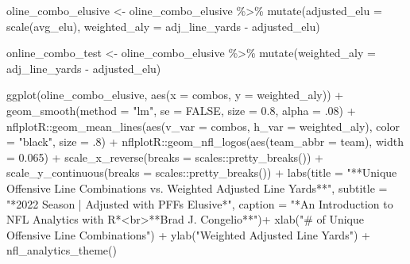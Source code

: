 \documentclass[
  letterpaper,
]{krantz}
\newenvironment{Shaded}{\begin{snugshade}}{\end{snugshade}}
\newcommand{\AttributeTok}[1]{\textcolor[rgb]{0.40,0.45,0.13}{#1}}
\newcommand{\ConstantTok}[1]{\textcolor[rgb]{0.56,0.35,0.01}{#1}}
\newcommand{\DecValTok}[1]{\textcolor[rgb]{0.68,0.00,0.00}{#1}}
\newcommand{\FloatTok}[1]{\textcolor[rgb]{0.68,0.00,0.00}{#1}}
\newcommand{\FunctionTok}[1]{\textcolor[rgb]{0.28,0.35,0.67}{#1}}
\newcommand{\NormalTok}[1]{\textcolor[rgb]{0.00,0.23,0.31}{#1}}
\newcommand{\OtherTok}[1]{\textcolor[rgb]{0.00,0.23,0.31}{#1}}
\newcommand{\SpecialCharTok}[1]{\textcolor[rgb]{0.37,0.37,0.37}{#1}}
\newcommand{\StringTok}[1]{\textcolor[rgb]{0.13,0.47,0.30}{#1}}
\begin{document}
\begin{Shaded}
\begin{Highlighting}[]
\NormalTok{oline\_combo\_elusive }\OtherTok{\textless{}{-}}\NormalTok{ oline\_combo\_elusive }\SpecialCharTok{\%\textgreater{}\%}
  \FunctionTok{mutate}\NormalTok{(}\AttributeTok{adjusted\_elu =} \FunctionTok{scale}\NormalTok{(avg\_elu),}
         \AttributeTok{weighted\_aly =}\NormalTok{ adj\_line\_yards }\SpecialCharTok{{-}}\NormalTok{ adjusted\_elu)}

\NormalTok{online\_combo\_test }\OtherTok{\textless{}{-}}\NormalTok{ oline\_combo\_elusive }\SpecialCharTok{\%\textgreater{}\%}
  \FunctionTok{mutate}\NormalTok{(}\AttributeTok{weighted\_aly =}\NormalTok{ adj\_line\_yards }\SpecialCharTok{{-}}\NormalTok{ adjusted\_elu)}

\FunctionTok{ggplot}\NormalTok{(oline\_combo\_elusive, }\FunctionTok{aes}\NormalTok{(}\AttributeTok{x =}\NormalTok{ combos, }\AttributeTok{y =}\NormalTok{ weighted\_aly)) }\SpecialCharTok{+}
  \FunctionTok{geom\_smooth}\NormalTok{(}\AttributeTok{method =} \StringTok{"lm"}\NormalTok{, }\AttributeTok{se =} \ConstantTok{FALSE}\NormalTok{, }\AttributeTok{size =} \FloatTok{0.8}\NormalTok{, }\AttributeTok{alpha =}\NormalTok{ .}\DecValTok{08}\NormalTok{) }\SpecialCharTok{+}
\NormalTok{  nflplotR}\SpecialCharTok{::}\FunctionTok{geom\_mean\_lines}\NormalTok{(}\FunctionTok{aes}\NormalTok{(}\AttributeTok{v\_var =}\NormalTok{ combos, }\AttributeTok{h\_var =}\NormalTok{ weighted\_aly),}
                            \AttributeTok{color =} \StringTok{"black"}\NormalTok{, }\AttributeTok{size =}\NormalTok{ .}\DecValTok{8}\NormalTok{) }\SpecialCharTok{+}
\NormalTok{  nflplotR}\SpecialCharTok{::}\FunctionTok{geom\_nfl\_logos}\NormalTok{(}\FunctionTok{aes}\NormalTok{(}\AttributeTok{team\_abbr =}\NormalTok{ team), }\AttributeTok{width =} \FloatTok{0.065}\NormalTok{) }\SpecialCharTok{+}
  \FunctionTok{scale\_x\_reverse}\NormalTok{(}\AttributeTok{breaks =}\NormalTok{ scales}\SpecialCharTok{::}\FunctionTok{pretty\_breaks}\NormalTok{()) }\SpecialCharTok{+}
  \FunctionTok{scale\_y\_continuous}\NormalTok{(}\AttributeTok{breaks =}\NormalTok{ scales}\SpecialCharTok{::}\FunctionTok{pretty\_breaks}\NormalTok{()) }\SpecialCharTok{+}
  \FunctionTok{labs}\NormalTok{(}\AttributeTok{title =} \StringTok{"**Unique Offensive Line Combinations vs. Weighted Adjusted Line Yards**"}\NormalTok{,}
       \AttributeTok{subtitle =} \StringTok{"*2022 Season  |  Adjusted with PFF\textquotesingle{}s \textquotesingle{}Elusive\textquotesingle{}*"}\NormalTok{,}
       \AttributeTok{caption =} \StringTok{"*An Introduction to NFL Analytics with R*\textless{}br\textgreater{}**Brad J. Congelio**"}\NormalTok{)}\SpecialCharTok{+}
  \FunctionTok{xlab}\NormalTok{(}\StringTok{"\# of Unique Offensive Line Combinations"}\NormalTok{) }\SpecialCharTok{+}
  \FunctionTok{ylab}\NormalTok{(}\StringTok{"Weighted Adjusted Line Yards"}\NormalTok{) }\SpecialCharTok{+}
  \FunctionTok{nfl\_analytics\_theme}\NormalTok{()}
\end{Highlighting}
\end{Shaded}
\end{document}
